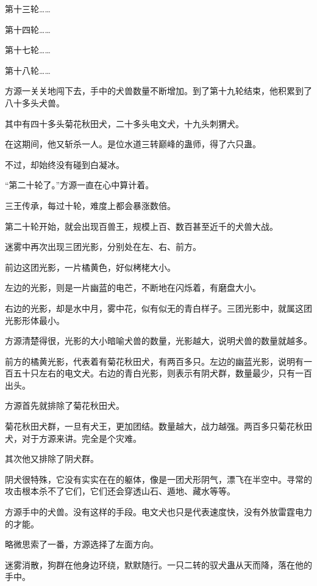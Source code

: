 
\begin{this_body}

第十三轮……

第十四轮……

第十七轮……

第十八轮……

方源一关关地闯下去，手中的犬兽数量不断增加。到了第十九轮结束，他积累到了八十多头犬兽。

其中有四十多头菊花秋田犬，二十多头电文犬，十九头刺猬犬。

在这期间，他又斩杀一人。是位水道三转巅峰的蛊师，得了六只蛊。

不过，却始终没有碰到白凝冰。

“第二十轮了。”方源一直在心中算计着。

三王传承，每过十轮，难度上都会暴涨数倍。

第二十轮开始，就会出现百兽王，规模上百、数百甚至近千的犬兽大战。

迷雾中再次出现三团光影，分别处在左、右、前方。

前边这团光影，一片橘黄色，好似栲栳大小。

左边的光影，则是一片幽蓝的电芒，不断地在闪烁着，有磨盘大小。

右边的光影，却是水中月，雾中花，似有似无的青白样子。三团光影中，就属这团光影形体最小。

方源清楚得很，光影的大小暗喻犬兽的数量，光影越大，说明犬兽的数量就越多。

前方的橘黄光影，代表着有菊花秋田犬，有两百多只。左边的幽蓝光影，说明有一百五十只左右的电文犬。右边的青白光影，则表示有阴犬群，数量最少，只有一百出头。

方源首先就排除了菊花秋田犬。

菊花秋田犬群，一旦有犬王，更加团结。数量越大，战力越强。两百多只菊花秋田犬，对于方源来讲。完全是个灾难。

其次他又排除了阴犬群。

阴犬很特殊，它没有实实在在的躯体，像是一团犬形阴气，漂飞在半空中。寻常的攻击根本杀不了它们，它们还会穿透山石、遁地、藏水等等。

方源手中的犬兽。没有这样的手段。电文犬也只是代表速度快，没有外放雷霆电力的才能。

略微思索了一番，方源选择了左面方向。

迷雾消散，狗群在他身边环绕，默默随行。一只二转的驭犬蛊从天而降，落在他的手中。


\end{this_body}
